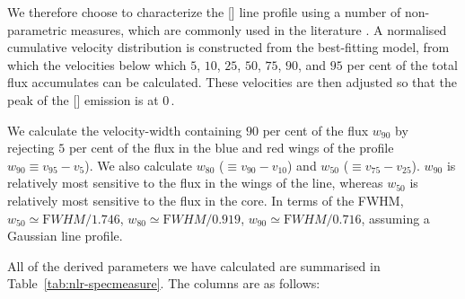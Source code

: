 We therefore choose to characterize the [] line profile using a number of non-parametric measures, which are commonly used in the literature \citep[e.g.][]{whittle85,zakamska14,zakamska16}. 
A normalised cumulative velocity distribution is constructed from the best-fitting model, from which the velocities below which $5$, $10$, $25$, $50$, $75$, $90$, and $95$ per cent of the total flux accumulates can be calculated. 
These velocities are then adjusted so that the peak of the [] emission is at $0$\,\kms. 

We calculate the velocity-width containing $90$ per cent of the flux $w_{90}$ by rejecting $5$ per cent of the flux in the blue and red wings of the profile $w_{90}\equiv v_{95} - v_{5}$).
We also calculate $w_{80}$ ($\equiv v_{90} - v_{10}$) and $w_{50}$ ($\equiv v_{75} - v_{25}$).
$w_{90}$ is relatively most sensitive to the flux in the wings of the line, whereas $w_50$ is relatively most sensitive to the flux in the core.  
In terms of the FWHM, $w_{50} \simeq {\mathrm FWHM} / 1.746$, $w_{80} \simeq {\mathrm FWHM} / 0.919$, $w_{90} \simeq {\mathrm FWHM} / 0.716$, assuming a Gaussian line profile.  

All of the derived parameters we have calculated are summarised in Table~\ref{tab:nlr-specmeasure}. 
The columns are as follows: 

